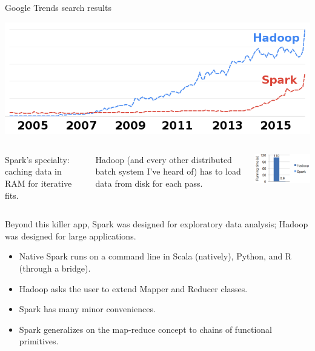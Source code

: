 \documentclass{beamer}
\begin{document}
\begin{frame}{Google Trends search results}
\begin{center}
\includegraphics[width=0.9\linewidth]{trends.png}
\end{center}
\end{frame}

\begin{frame}{}
\begin{columns}
Spark's specialty: caching data in RAM for iterative fits.

\vspace{0.2 cm}
Hadoop (and every other distributed batch system I've heard of) has to load data from disk for each pass.

\includegraphics[width=\linewidth]{spark_time.png}
\end{columns}

\vfill
Beyond this killer app, Spark was designed for exploratory data analysis; Hadoop was designed for large applications.
\begin{itemize}
\item Native Spark runs on a command line in Scala (natively), Python, and R (through a bridge).
\item Hadoop asks the user to extend Mapper and Reducer classes.
\item Spark has many minor conveniences.
\item Spark generalizes on the map-reduce concept to chains of functional primitives.
\end{itemize}
\end{frame}
\end{document}
